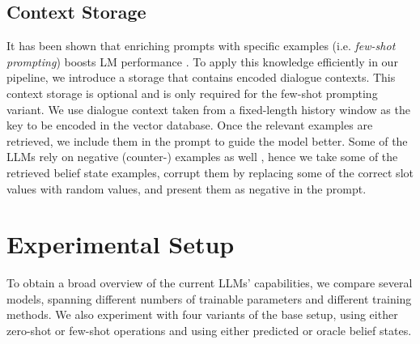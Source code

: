 \subsection{Context Storage}
\label{07:sec:context-store}
It has been shown that enriching prompts with specific examples (i.e. \emph{few-shot prompting}) boosts LM performance \cite{madotto2020language,brown2020language}.
To apply this knowledge efficiently in our pipeline, we introduce a storage that contains encoded dialogue contexts.
This context storage is optional and is only required for the few-shot prompting variant.
We use dialogue context taken from a fixed-length history window as the key to be encoded in the vector database.
Once the relevant examples are retrieved, we include them in the prompt to guide the model better.
Some of the LLMs rely on negative (counter-) examples as well \cite{supernaturalinstructions}, hence we take some of the retrieved belief state examples, corrupt them by replacing some of the correct slot values with random values, and present them as negative in the prompt.

\section{Experimental Setup}
\label{07:sec:experiments}

To obtain a broad overview of the current LLMs' capabilities, we compare several models, spanning different numbers of trainable parameters and different training methods. 
We also experiment with four variants of the base setup, using either zero-shot or few-shot operations and using either predicted or oracle belief states.

